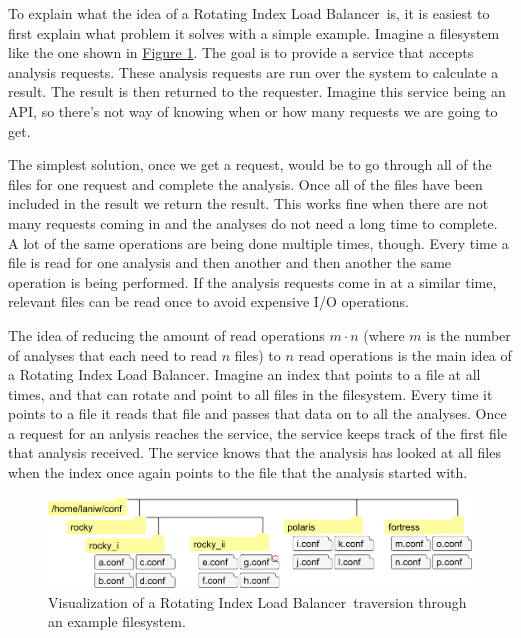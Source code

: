 \documentclass[11pt]{article} %
\newcommand{\rilb}{Rotating Index Load Balancer}
\newcommand{\hidelinks}[1]{{\hypersetup{hidelinks}#1}}
\newcommand{\figref}[1]{\hidelinks{\hyperref[#1]{Figure \ref{#1}}}}
\begin{document}
  To explain what the idea of a \rilb\ is, it is easiest to first explain what problem it solves with a simple example. Imagine a filesystem like the one shown in \figref{fig:rilb-vis}. The goal is to provide a service that accepts analysis requests. These analysis requests are run over the system to calculate a result. The result is then returned to the requester. Imagine this service being an API, so there's not way of knowing when or how many requests we are going to get.

  The simplest solution, once we get a request, would be to go through all of the files for one request and complete the analysis. Once all of the files have been included in the result we return the result. This works fine when there are not many requests coming in and the analyses do not need a long time to complete. A lot of the same operations are being done multiple times, though. Every time a file is read for one analysis and then another and then another the same operation is being performed. If the analysis requests come in at a similar time, relevant files can be read once to avoid expensive I/O operations.

  The idea of reducing the amount of read operations $m \cdot n$ (where $m$ is the number of analyses that each need to read $n$ files) to $n$ read operations is the main idea of a \rilb. Imagine an index that points to a file at all times, and that can rotate and point to all files in the filesystem. Every time it points to a file it reads that file and passes that data on to all the analyses. Once a request for an anlysis reaches the service, the service keeps track of the first file that analysis received. The service knows that the analysis has looked at all files when the index once again points to the file that the analysis started with.

  \begin{figure}[H]
    \centering
    \includegraphics[width=.99\linewidth, keepaspectratio]{res/rilb_visualization}
    \caption{Visualization of a \rilb\ traversion through an example filesystem.}
    \label{fig:rilb-vis}
  \end{figure}
\end{document}
